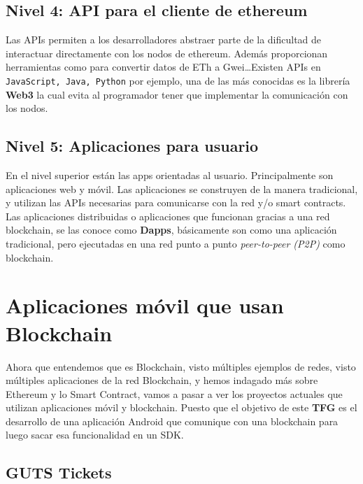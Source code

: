 \subsection{Nivel 4: API para el cliente de ethereum}

Las APIs permiten a los desarrolladores abstraer parte de la dificultad de interactuar directamente con los nodos de ethereum. Además proporcionan herramientas como para convertir datos de ETh a Gwei\dots Existen APIs en \verb|JavaScript, Java, Python| por ejemplo, una de las más conocidas es la librería \textbf{Web3}\cite{web3} la cual evita al programador tener que implementar la comunicación con los nodos. 

\subsection{Nivel 5: Aplicaciones para usuario}

En el nivel superior están las apps orientadas al usuario. Principalmente son aplicaciones web y móvil. Las aplicaciones se construyen de la manera tradicional, y utilizan las APIs necesarias para comunicarse con la red y/o smart contracts. Las aplicaciones distribuidas o aplicaciones que funcionan gracias a una red blockchain, se las conoce como \textbf{Dapps}, básicamente son como una aplicación tradicional, pero ejecutadas en una red punto a punto \textit{peer-to-peer (P2P)} como blockchain.

\section{Aplicaciones móvil que usan Blockchain}

Ahora que entendemos que es Blockchain, visto múltiples ejemplos de redes, visto múltiples aplicaciones de la red Blockchain, y hemos indagado más sobre Ethereum y lo Smart Contract, vamos a pasar a ver los proyectos actuales que utilizan aplicaciones móvil y blockchain. Puesto que el objetivo de este \textbf{TFG} es el desarrollo de una aplicación Android que comunique con una blockchain para luego sacar esa funcionalidad en un SDK.

\subsection{GUTS Tickets}

